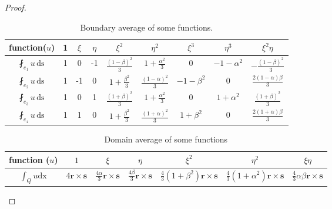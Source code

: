 \documentclass[12pt,showkeys]{amsart}
\begin{document}
\begin{proof}
\begin{table}[htbp]
\begin{tabular}{c|cccccccc}
 function($u$) & 1 & $\xi$ & $\eta$ & $\xi^2$ & $\eta^2$ & $\xi^3$ & $\eta^3$ & $\xi^2\eta$ \\
\hline $\displaystyle\fint_{e_1}u{\,\mathrm{ds}\,}$ & 1 & 0 & -1 & $\displaystyle \frac{(1-\beta)^2}{3}$ & $\displaystyle 1+\frac{\alpha^2}{3}$&$\displaystyle 0$ & $\displaystyle -1-\alpha^2$ & $\displaystyle -\frac{(1-\beta)^2}{3}$ \\
\hline $\displaystyle\fint_{e_2}u{\,\mathrm{ds}\,}$ & 1 & -1 & 0 & $\displaystyle 1+\frac{\beta^2}{3}$ & $\displaystyle \frac{(1-\alpha)^2}{3}$ & $\displaystyle -1-\beta^2$ & $\displaystyle 0$ & $\displaystyle \frac{2(1-\alpha)\beta}{3}$ \\
\hline $\displaystyle\fint_{e_3}u{\,\mathrm{ds}\,}$ & 1 & 0 & 1 & $\displaystyle \frac{(1+\beta)^2}{3}$ & $\displaystyle 1+\frac{\alpha^2}{3}$ & $\displaystyle 0$ & $\displaystyle 1+\alpha^2$ & $\displaystyle \frac{(1+\beta)^2}{3}$ \\
\hline $\displaystyle\fint_{e_4}u{\,\mathrm{ds}\,}$ & 1 & 1 & 0 & $\displaystyle 1+\frac{\beta^2}{3}$ & $\displaystyle \frac{(1+\alpha)^2}{3}$ & $\displaystyle 1+\beta^2$ & $\displaystyle 0$ & $\displaystyle \frac{2(1+\alpha)\beta}{3}$ \\
\hline
\end{tabular}
\caption{Boundary average of some functions.}\label{tab:tecasis}
\end{table}

\begin{table}[htbp]
\begin{tabular}{c|cccccc} 
function ($u$) & $1$ & $\xi$ & $\eta$ & $\xi^2$ & $\eta^2$ & $\xi\eta$ \\
\hline $\int_Q u{\mathrm{dx}}$ & $4{\mathbf{r}}\times{\mathbf{s}}$ & $\frac{4\alpha}{3}{\mathbf{r}}\times{\mathbf{s}}$ & $\frac{4\beta}{3}{\mathbf{r}}\times{\mathbf{s}}$ & $\frac{4}{3}(1+\beta^2){\mathbf{r}}\times{\mathbf{s}}$ & $\frac{4}{3}(1+\alpha^2){\mathbf{r}}\times{\mathbf{s}}$ & $\frac{4}{3}\alpha\beta{\mathbf{r}}\times{\mathbf{s}}$ \\ 
\hline
\end{tabular}
\caption{Domain average of some functions}\label{tab:da}
\end{table}


\end{proof}
\end{document}
